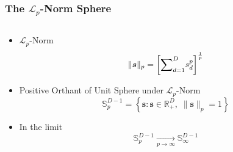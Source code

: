 \documentclass[aspectratio=169,10pt,notes]{beamer}
\newlength{\frametextheight}
\begin{document}
\begin{frame}
    \frametitle{The $\mathcal{L}_p$-Norm Sphere}
    \begin{columns}
        \begin{column}{.49\textwidth}
            {\small 
            \begin{itemize}
                \item $\mathcal{L}_p$-Norm
                \[
                    \lVert \bm{s} \rVert_p = 
                        \left[{\scriptsize \sum}_{d = 1}^D s_d^p\right]^{\frac{1}{p}}
                \]
                \item Positive Orthant of Unit Sphere under $\mathcal{L}_p$-Norm
                \[
                    \mathbb{S}_p^{D-1} = \left\lbrace 
                        \bm{s} : \bm{s} \in \mathbb{R}_+^D, \; \lVert \bm{s}\rVert_p = 1
                        \right\rbrace
                \]
                \item In the limit
                \[
                    \mathbb{S}_p^{D-1} 
                        \xrightarrow[p\to\infty]{} \mathbb{S}_{\infty}^{D-1}
                \]
            \end{itemize}
            }
        \end{column}%
        \hfill
    \end{columns}
\end{frame} %
\end{document}
